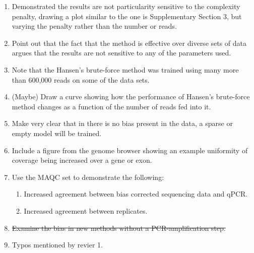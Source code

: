 \documentclass{article}
\begin{document}

\begin{enumerate}

\item Demonstrated the results are not particularity sensitive to the
complexity penalty, drawing a plot similar to the one is Supplementary Section
3, but varying the penalty rather than the number or reads.

\item Point out that the fact that the method is effective over diverse sets of
data argues that the results are not sensitive to any of the parameters used.

\item Note that the Hansen's brute-force method was trained using many more than
600,000 reads on some of the data sets.

\item (Maybe) Draw a curve showing how the performance of Hansen's brute-force
method changes as a function of the number of reads fed into it.

\item Make very clear that in there is no bias present in the data, a sparse or
empty model will be trained.

\item Include a figure from the genome browser showing an example uniformity of
coverage being increased over a gene or exon.

\item Use the MAQC set to demonstrate the following:
\begin{enumerate}
\item Increased agreement between bias corrected sequencing data and qPCR.
\item Increased agreement between replicates.
\end{enumerate}

\item \sout{Examine the bias in new methods without a PCR-amplification step.}

\item Typos mentioned by revier 1.


\end{enumerate}
\end{document}
